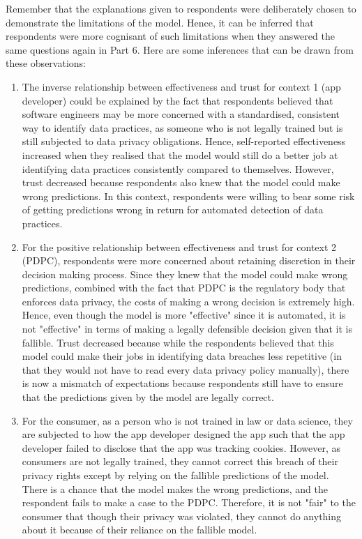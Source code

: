 Remember that the explanations given to respondents were deliberately chosen to demonstrate the limitations of the model. Hence, it can be inferred that respondents were more cognisant of such limitations when they answered the same questions again in Part 6. Here are some inferences that can be drawn from these observations:
\begin{enumerate}
    \item The inverse relationship between effectiveness and trust for context 1 (app developer) could be explained by the fact that respondents believed that software engineers may be more concerned with a standardised, consistent way to identify data practices, as someone who is not legally trained but is still subjected to data privacy obligations. Hence, self-reported effectiveness increased when they realised that the model would still do a better job at identifying data practices consistently compared to themselves. However, trust decreased because respondents also knew that the model could make wrong predictions. In this context, respondents were willing to bear some risk of getting predictions wrong in return for automated detection of data practices.
    \item For the positive relationship between effectiveness and trust for context 2 (PDPC), respondents were more concerned about retaining discretion in their decision making process. Since they knew that the model could make wrong predictions, combined with the fact that PDPC is the regulatory body that enforces data privacy, the costs of making a wrong decision is extremely high. Hence, even though the model is more "effective" since it is automated, it is not "effective" in terms of making a legally defensible decision given that it is fallible. Trust decreased because while the respondents believed that this model could make their jobs in identifying data breaches less repetitive (in that they would not have to read every data privacy policy manually), there is now a mismatch of expectations because respondents still have to ensure that the predictions given by the model are legally correct.
    \item For the consumer, as a person who is not trained in law or data science, they are subjected to how the app developer designed the app such that the app developer failed to disclose that the app was tracking cookies. However, as consumers are not legally trained, they cannot correct this breach of their privacy rights except by relying on the fallible predictions of the model. There is a chance that the model makes the wrong predictions, and the respondent fails to make a case to the PDPC. Therefore, it is not "fair" to the consumer that though their privacy was violated, they cannot do anything about it because of their reliance on the fallible model.

\end{enumerate}

